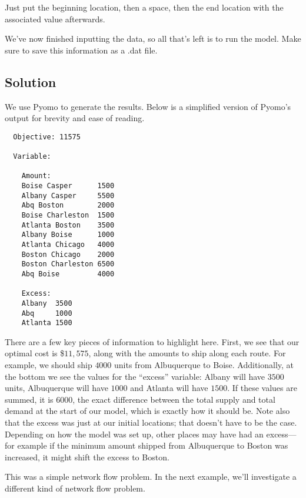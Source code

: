 \documentclass{article}
\begin{document}
\noindent
Just put the beginning location, then a space, then the end location with the associated value afterwards.

We've now finished inputting the data, so all that's left is to run the model.  Make sure to save this information as a .dat file.

\subsection*{Solution}

We use Pyomo to generate the results.  Below is a simplified version of Pyomo's output for brevity and ease of reading.

\begin{verbatim}
  Objective: 11575

  Variable: 

    Amount:
    Boise Casper      1500
    Albany Casper     5500
    Abq Boston        2000
    Boise Charleston  1500
    Atlanta Boston    3500
    Albany Boise      1000
    Atlanta Chicago   4000
    Boston Chicago    2000
    Boston Charleston 6500
    Abq Boise         4000

    Excess:
    Albany  3500
    Abq     1000
    Atlanta 1500
\end{verbatim}

There are a few key pieces of information to highlight here.  First, we see that our optimal cost is \$$11,575$, along with the amounts to ship along each route.  For example, we should ship $4000$ units from Albuquerque to Boise.  Additionally, at the bottom we see the values for the ``excess'' variable: Albany will have $3500$ units, Albuquerque will have $1000$ and Atlanta will have $1500$.  If these values are summed, it is $6000$, the exact difference between the total supply and total demand at the start of our model, which is exactly how it should be.  Note also that the excess was just at our initial locations; that doesn't have to be the case.  Depending on how the model was set up, other places may have had an excess---for example if the minimum amount shipped from Albuquerque to Boston was increased, it might shift the excess to Boston.

This was a simple network flow problem.  In the next example, we'll investigate a different kind of network flow problem.
\end{document}
